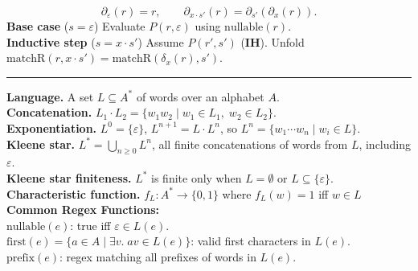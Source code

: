 \documentclass[9pt, a4paper]{extarticle}
\let\oldhrule\hrule
\renewcommand{\hrule}{\vspace{3pt}\oldhrule\vspace{3pt}}
\begin{document}
\begin{minipage}[t]{0.495\textwidth}
\[
\partial_\varepsilon(r)=r, \qquad \partial_{x\cdot s'}(r)=\partial_{s'}(\partial_x(r)).
\]
\textbf{Base case} ($s=\varepsilon$) \quad Evaluate $P(r,\varepsilon)$ using $\text{nullable}(r)$. \\
\textbf{Inductive step} ($s=x\cdot s'$) \quad Assume $P(r',s')$ (\textbf{IH}). Unfold $\text{matchR}(r, x\cdot s') = \text{matchR}(\delta_x(r), s')$. 
\hrule
\textbf{Language.} A set $L \subseteq A^*$ of words over an alphabet $A$. \\
\textbf{Concatenation.} $L_1 \cdot L_2 = \{w_1 w_2 \mid w_1 \in L_1,\; w_2 \in L_2\}$. \\
\textbf{Exponentiation.} $L^0 = \{\varepsilon\}$, \; $L^{n+1} = L \cdot L^n$, so $L^n = \{w_1 \cdots w_n \mid w_i \in L\}$. \\
\textbf{Kleene star.} $L^* = \bigcup_{n \geq 0} L^n$, all finite concatenations of words from $L$, including $\varepsilon$. \\
\textbf{Kleene star finiteness.} $L^*$ is finite only when $L = \emptyset$ or $L \subseteq \{\varepsilon\}$. \\
\textbf{Characteristic function.} $f_L : A^* \to \{0,1\}$ where $f_L(w) = 1$ iff $w \in L$\\
\textbf{Common Regex Functions:}\\
$\text{nullable}(e)$: true iff $\varepsilon \in L(e)$.\\
$\text{first}(e) = \{a \in A \mid \exists v.\; av \in L(e)\}$: valid first characters in $L(e)$.\\
$\text{prefix}(e)$: regex matching all prefixes of words in $L(e)$.\\
\end{minipage}
\end{document}
